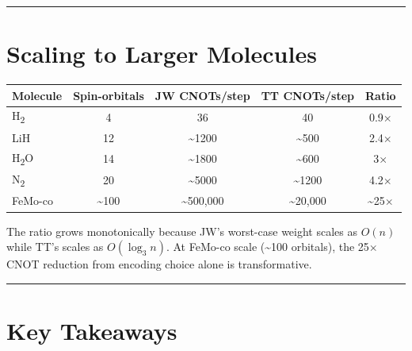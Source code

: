 \documentclass[
  11pt,
  oneside]{book}
\begin{document}
\begin{center}\rule{0.5\linewidth}{0.5pt}\end{center}

\section{Scaling to Larger Molecules}\label{scaling-to-larger-molecules}

\begin{longtable}[]{@{}lcccc@{}}
\toprule\noalign{}
Molecule & Spin-orbitals & JW CNOTs/step & TT CNOTs/step & Ratio \\
\midrule\noalign{}
\endhead
\bottomrule\noalign{}
\endlastfoot
H\textsubscript{2} & 4 & 36 & 40 & 0.9$\times$ \\
LiH & 12 & \textasciitilde1200 & \textasciitilde500 & 2.4$\times$ \\
H\textsubscript{2}O & 14 & \textasciitilde1800 & \textasciitilde600 & 3$\times$ \\
N\textsubscript{2} & 20 & \textasciitilde5000 & \textasciitilde1200 & 4.2$\times$ \\
FeMo-co & \textasciitilde100 & \textasciitilde500,000 &
\textasciitilde20,000 & \textasciitilde25$\times$ \\
\end{longtable}

The ratio grows monotonically because JW's worst-case weight scales as
\(O(n)\) while TT's scales as \(O(\log_3 n)\). At FeMo-co scale
(\textasciitilde100 orbitals), the 25$\times$ CNOT reduction from encoding
choice alone is transformative.

\begin{center}\rule{0.5\linewidth}{0.5pt}\end{center}

\section{Key Takeaways}\label{key-takeaways-16}
\end{document}
